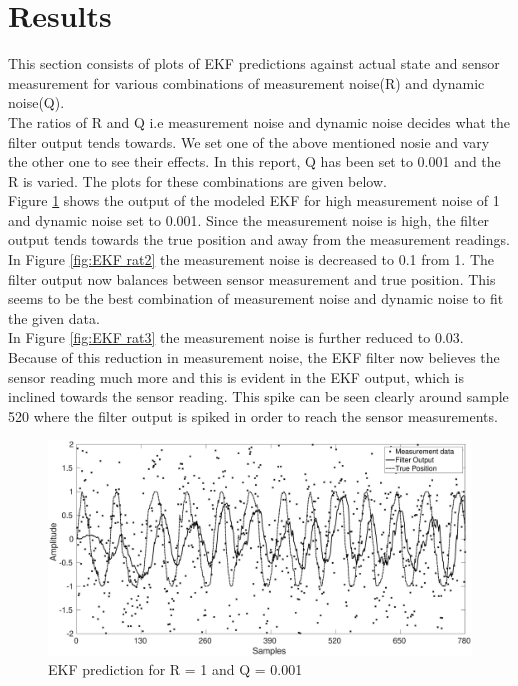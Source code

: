 \documentclass[12pt]{article}
\begin{document}
\newpage
\section{Results}
This section consists of plots of EKF predictions against actual state and sensor measurement for various combinations of measurement noise(R) and dynamic noise(Q).  \\

The ratios of R and Q i.e measurement noise and dynamic noise decides what the filter output tends towards. We set one of the above mentioned nosie and vary the other one to see their effects. In this report, Q has been set to 0.001 and the R is varied. The plots for these combinations are given below. \\

Figure \ref{fig:EKF rat1} shows the output of the modeled EKF for high measurement noise of 1 and dynamic noise set to 0.001. Since the measurement noise is high, the filter output tends towards the true position and away from the measurement readings. \\

In Figure \ref{fig:EKF rat2} the measurement noise is decreased to 0.1 from 1. The filter output now balances between sensor measurement and true position. This seems to be the best combination of measurement noise and dynamic noise to fit the given data.\\

In Figure \ref{fig:EKF rat3} the measurement noise is further reduced to 0.03. Because of this reduction in measurement noise, the EKF filter now believes the sensor reading much more and this is evident in the EKF output, which is 
inclined towards the sensor reading. This spike can be seen clearly around sample 520 where the filter output is spiked in order to reach the sensor measurements. \\

\begin{figure}[b!]
\centering
	\includegraphics[width = \textwidth]{./Figures/ratio1.eps}
	\caption{EKF prediction for R = 1 and Q = 0.001}
	\label{fig:EKF rat1}
\end{figure}
\end{document}
